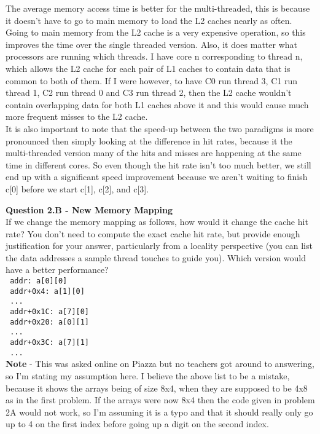\documentclass[a4paper,11pt]{article}
\begin{document}
The average memory access time is better for the multi-threaded, this is because it doesn't have to go to main memory to load the L2 caches nearly as often. Going to main memory from the L2 cache is a very expensive operation, so this improves the time over the single threaded version. Also, it does matter what processors are running which threads. I have core n corresponding to thread n, which allows the L2 cache for each pair of L1 caches to contain data that is common to both of them. If I were however, to have C0 run thread 3, C1 run thread 1, C2 run thread 0 and C3 run thread 2, then the L2 cache wouldn't contain overlapping data for both L1 caches above it and this would cause much more frequent misses to the L2 cache. \\

It is also important to note that the speed-up between the two paradigms is more pronounced then simply looking at the difference in hit rates, because it the multi-threaded version many of the hits and misses are happening at the same time in different cores. So even though the hit rate isn't too much better, we still end up with a significant speed improvement because we aren't waiting to finish c[0] before we start c[1], c[2], and c[3].

\item \textbf{Question 2.B - New Memory Mapping} \\ 

If we change the memory mapping as follows, how would it change the cache hit rate? You don’t need to compute the exact cache hit rate, but provide enough justification for your answer, particularly from a locality perspective (you can list the data addresses a sample thread touches to guide you). Which version would have a better performance? \\

\verb, addr: a[0][0] , \\
\verb, addr+0x4: a[1][0] , \\
\verb, ... , \\
\verb, addr+0x1C: a[7][0] , \\
\verb, addr+0x20: a[0][1] , \\
\verb, ... , \\
\verb, addr+0x3C: a[7][1] , \\
\verb, ... , \\


\textbf{ Note } - This was asked online on Piazza but no teachers got around to answering, so I'm stating my assumption here. I believe the above list to be a mistake, because it shows the arrays being of size 8x4, when they are supposed to be 4x8 as in the first problem. If the arrays were now 8x4 then the code given in problem 2A would not work, so I'm assuming it is a typo and that it should really only go up to 4 on the first index before going up a digit on the second index. \\
\end{document}
